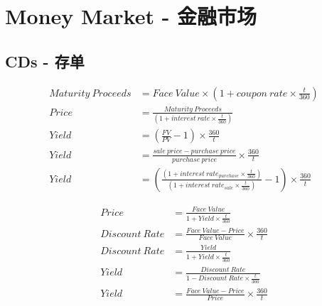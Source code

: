 \section{Money Market - 金融市场}

\subsection{CDs - 存单}
\begin{equation}
    \begin{aligned}
        Maturity\ Proceeds &= Face\ Value \times (1 + coupon\ rate \times \frac{t}{360}) \\
        Price &= \frac{Maturity\ Proceeds}{(1 + interest\ rate \times \frac{t}{360})} \\
        Yield &= (\frac{FV}{PV} - 1) \times \frac{360}{t}  \\
        Yield &= \frac{sale\ price - purchase\ price}{purchase\ price} \times \frac{360}{t} \\ 
        Yield &= (\frac{(1 +interest\ rate_{purchase} \times \frac{t}{360})}{(1 + interest\ rate_{sale} \times \frac{t}{360})} - 1) \times \frac{360}{t}
    \end{aligned}
\end{equation}

\begin{equation}
    \begin{aligned}
        Price &= \frac{Face\ Value}{1 + Yield \times \frac{t}{360}} \\
        Discount\ Rate &= \frac{Face\ Value - Price}{Face\ Value} \times \frac{360}{t} \\
        Discount\ Rate &= \frac{Yield}{1 + Yield \times \frac{t}{360}} \\
        Yield &= \frac{Discount\ Rate}{1 - Discount\ Rate \times \frac{t}{360}} \\
        Yield &= \frac{Face\ Value - Price}{Price} \times \frac{360}{t} \\
    \end{aligned}
\end{equation}